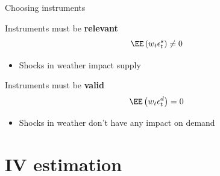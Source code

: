 \documentclass[compress, 8pt]{beamer}
\begin{document}
\begin{frame}{Choosing instruments}

Instruments must be \textbf{relevant}
\begin{equation*}
    \EE\left(w_{t}\epsilon_{t}^{s}\right)\neq0
\end{equation*}
\begin{itemize}
    \item Shocks in weather impact supply
\end{itemize}

\vspace{3ex}
Instruments must be \textbf{valid}
\begin{equation*}
    \EE\left(w_{t}\epsilon_{t}^{d}\right)=0
\end{equation*}
\begin{itemize}
    \item Shocks in weather don't have any impact on demand
\end{itemize}

\end{frame}


\section[Estimation]{IV estimation}
\miniframesoff
\begin{frame}
    \tableofcontents[currentsection]
\end{frame}
\miniframeson
\end{document}
